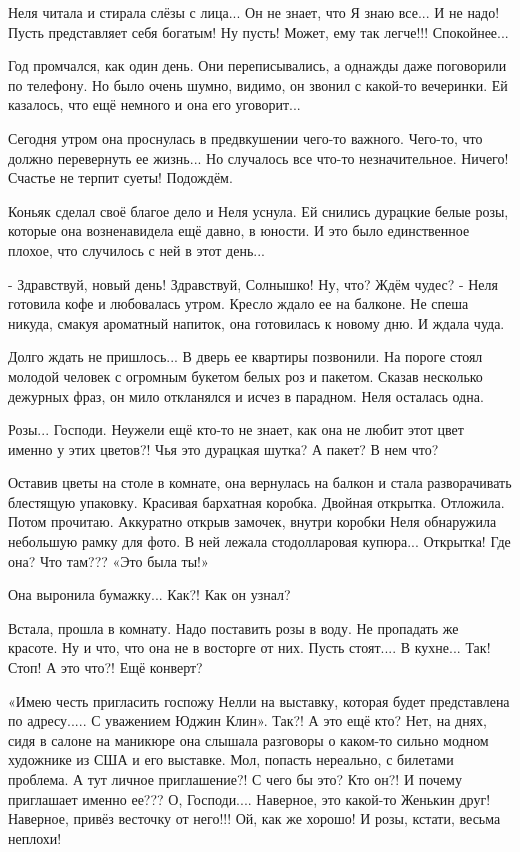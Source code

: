 Неля читала и стирала слёзы с лица... Он не знает, что Я знаю все... И не надо!
Пусть представляет себя богатым! Ну пусть! Может, ему так легче!!! Спокойнее...

Год промчался, как один день. Они переписывались, а однажды даже поговорили по
телефону. Но было очень шумно, видимо, он звонил с какой-то вечеринки. Ей
казалось, что ещё немного и она его уговорит...

Сегодня утром она проснулась в предвкушении чего-то важного. Чего-то, что должно
перевернуть ее жизнь... Но случалось все что-то незначительное. Ничего! Счастье
не терпит суеты! Подождём.

Коньяк сделал своё благое дело и Неля уснула. Ей снились дурацкие белые
розы, которые она возненавидела ещё давно, в юности. И это было единственное
плохое, что случилось с ней в этот день...

- Здравствуй, новый день! Здравствуй, Солнышко! Ну, что? Ждём чудес? - Неля
готовила кофе и любовалась утром. Кресло ждало ее на балконе. Не спеша
никуда, смакуя ароматный напиток, она готовилась к новому дню. И ждала чуда.


Долго ждать не пришлось... В дверь ее квартиры позвонили. На пороге стоял молодой
человек с огромным букетом белых роз и пакетом. Сказав несколько дежурных
фраз, он мило откланялся и исчез в парадном. Неля осталась одна.

Розы... Господи. Неужели ещё кто-то не знает, как она не любит этот цвет именно у
этих цветов?! Чья это дурацкая шутка? А пакет? В нем что? 

Оставив цветы на столе в комнате, она вернулась на балкон и стала разворачивать
блестящую упаковку. Красивая бархатная коробка. Двойная открытка. Отложила. Потом
прочитаю. Аккуратно открыв замочек, внутри коробки Неля обнаружила небольшую
рамку для фото. В ней лежала стодолларовая купюра... Открытка! Где она? Что
там??? «Это была ты!» 

Она выронила бумажку... Как?! Как он узнал? 

Встала, прошла в комнату. Надо поставить розы в воду. Не пропадать же красоте. Ну и
что, что она не в восторге от них. Пусть стоят.... В кухне... Так! Стоп! А это
что?! Ещё конверт? 

«Имею честь пригласить госпожу Нелли на выставку, которая будет представлена по
адресу..... С уважением Юджин Клин». Так?! А это ещё кто? Нет, на днях, сидя в
салоне на маникюре она слышала разговоры о каком-то сильно модном художнике из
США и его выставке. Мол, попасть нереально, с билетами проблема. А тут личное
приглашение?! С чего бы это? Кто он?! И почему приглашает именно ее???
О, Господи.... Наверное, это какой-то Женькин друг! Наверное, привёз весточку от
него!!! Ой, как же хорошо! И розы, кстати, весьма неплохи!

